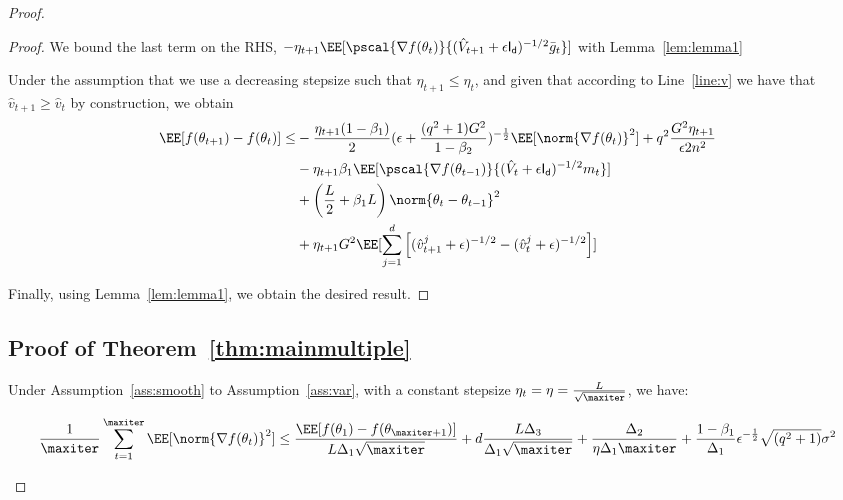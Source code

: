 \documentclass[11pt]{article}
\begin{document}
\begin{proof}
\begin{proof}
We bound the last term on the RHS, $ -\eta_{t+1} \EE[\pscal{\nabla f(\theta_t)}{(\hat{V}_{t+1} + \epsilon \mathsf{I_d})^{-1/2} \bar{g}_t}]$ with Lemma~\ref{lem:lemma1}

Under the assumption that we use a decreasing stepsize such that $\eta_{t+1} \leq \eta_{t}$, and given that according to Line~\ref{line:v} we have that $\hat v_{t+1} \geq \hat v_{t}$ by construction, we obtain 
\begin{equation}
\begin{split}
\EE[f(\theta_{t+1}) - f(\theta_{t}) ] \leq &   - \frac{\eta_{t+1}(1-\beta_1)}{2}  (\epsilon + \frac{(q^2+1)G^2}{1 - \beta_2})^{-\frac{1}{2}} \EE[\norm{\nabla f(\theta_t)}^2] +q^2 \frac{G^2 \eta_{t+1}}{\epsilon 2n^2} \\
&- \eta_{t+1} \beta_1\EE[\pscal{\nabla f(\theta_{t-1})}{(\hat{V}_{t} + \epsilon \mathsf{I_d})^{-1/2} m_{t}}]\\
& +  \left(\frac{L}{2} + \beta_1 L \right) \norm{\theta_t - \theta_{t-1}}^2\\
&+   \eta_{t+1} G^2 \EE[\sum_{j=1}^d \left[(\hat{v}^j_{t+1} + \epsilon )^{-1/2} - (\hat{v}^j_{t} + \epsilon )^{-1/2}  \right] ]
\end{split}
\end{equation}

Finally, using Lemma~\ref{lem:lemma1}, we obtain the desired result.
\end{proof}



\subsection{Proof of Theorem~\ref{thm:mainmultiple}}


\begin{Theorem*}
Under Assumption~\ref{ass:smooth} to Assumption~\ref{ass:var}, with a constant stepsize $\eta_t = \eta = \frac{L}{\sqrt{\maxiter}}$, we have:

\begin{equation}
\begin{split}
 \frac{1}{\maxiter}\sum_{t=1}^{\maxiter} \EE[\norm{\nabla f(\theta_t)}^2] \leq \frac{\EE[ f(\theta_{1}) - f(\theta_{\maxiter+1})]}{L \Delta_1 \sqrt{\maxiter}} + 
d\frac{L \Delta_3}{\Delta_1 \sqrt{\maxiter}}  + \frac{\Delta_2}{\eta \Delta_1\maxiter} +\frac{1-\beta_1}{\Delta_1}  \epsilon^{-\frac{1}{2}} \sqrt{(q^2+1)}\sigma^2 
\end{split}
\end{equation}


\end{Theorem*}
\end{proof}
\end{document}
